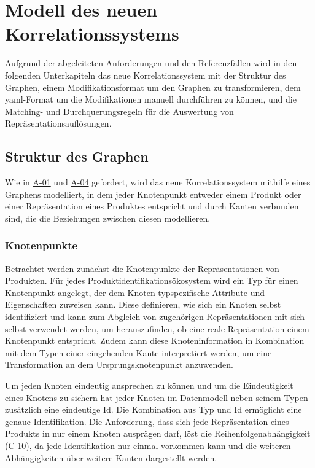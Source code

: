 \section{Modell des neuen Korrelationssystems}\label{sec:model-modellierungsansatz}

Aufgrund der abgeleiteten Anforderungen und den Referenzfällen wird in den folgenden Unterkapiteln das neue Korrelationssystem mit der Struktur des Graphen, einem Modifikationsformat um den Graphen zu transformieren, dem \acrshort{yaml}-Format um die Modifikationen manuell durchführen zu können, und die Matching- und Durchquerungsregeln für die Auswertung von Repräsentationsauflösungen.

\subsection{Struktur des Graphen}\label{subsec:model-graph-struktur}

Wie in \hyperref[subsec:req-format-product-graph]{A-01} und \hyperref[subsec:req-product-concept]{A-04} gefordert, wird das neue Korrelationssystem mithilfe eines Graphens modelliert, in dem jeder Knotenpunkt entweder einem Produkt oder einer Repräsentation eines Produktes entspricht und durch Kanten verbunden sind, die die Beziehungen zwischen diesen modellieren.

\subsubsection{Knotenpunkte}\label{subsubsec:model-graph-knoten}

Betrachtet werden zunächst die Knotenpunkte der Repräsentationen von Produkten.
Für jedes Produktidentifikationsökosystem wird ein Typ für einen Knotenpunkt angelegt, der dem Knoten typspezifische Attribute und Eigenschaften zuweisen kann.
Diese definieren, wie sich ein Knoten selbst identifiziert und kann zum Abgleich von zugehörigen Repräsentationen mit sich selbst verwendet werden, um herauszufinden, ob eine reale Repräsentation einem Knotenpunkt entspricht.
Zudem kann diese Knoteninformation in Kombination mit dem Typen einer eingehenden Kante interpretiert werden, um eine Transformation an dem Ursprungsknotenpunkt anzuwenden.

Um jeden Knoten eindeutig ansprechen zu können und um die Eindeutigkeit eines Knotens zu sichern hat jeder Knoten im Datenmodell neben seinem Typen zusätzlich eine eindeutige Id.
Die Kombination aus Typ und Id ermöglicht eine genaue Identifikation.
Die Anforderung, dass sich jede Repräsentation eines Produkts in nur einem Knoten ausprägen darf, löst die Reihenfolgenabhängigkeit (\hyperref[subsec:c-10-order-dependency]{C-10}), da jede Identifikation nur einmal vorkommen kann und die weiteren Abhängigkeiten über weitere Kanten dargestellt werden.

